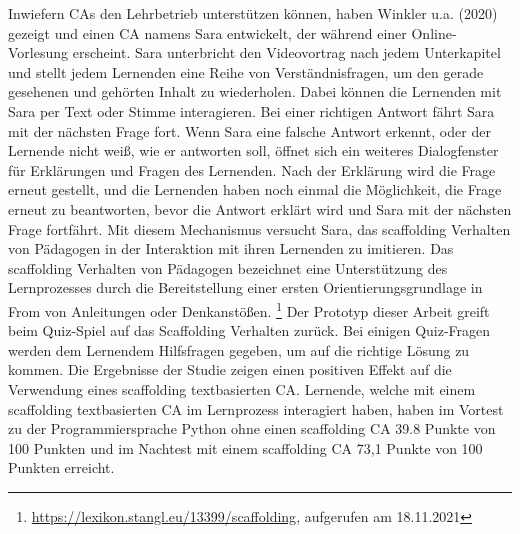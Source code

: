         Inwiefern CAs den Lehrbetrieb unterstützen können, haben Winkler u.a. (2020) gezeigt und einen CA namens Sara entwickelt, der während einer 
        Online-Vorlesung erscheint. 
        Sara unterbricht den Videovortrag nach jedem Unterkapitel
        und stellt jedem Lernenden eine Reihe von Verständnisfragen, um den gerade gesehenen und gehörten Inhalt zu wiederholen.
        Dabei können die Lernenden mit Sara per Text oder Stimme interagieren.
        Bei einer richtigen Antwort fährt Sara mit der nächsten Frage fort. 
        Wenn Sara eine falsche Antwort erkennt, oder der Lernende nicht weiß,
        wie er antworten soll, öffnet sich ein weiteres Dialogfenster für Erklärungen und Fragen 
        des Lernenden. Nach der Erklärung wird die Frage erneut gestellt, und die Lernenden haben noch einmal die Möglichkeit, 
        die Frage erneut zu beantworten, bevor die Antwort erklärt wird und Sara mit der nächsten Frage fortfährt. \parencite[4 f.]{winkler_hobert_salovaara_söllner_leimeister_2020}
        Mit diesem Mechanismus versucht Sara, das scaffolding Verhalten von Pädagogen in der Interaktion mit ihren Lernenden zu imitieren. 
        Das scaffolding Verhalten von Pädagogen bezeichnet eine Unterstützung des Lernprozesses durch die Bereitstellung einer ersten Orientierungsgrundlage
        in From von Anleitungen oder Denkanstößen. \footnote{\url{https://lexikon.stangl.eu/13399/scaffolding}, aufgerufen am 18.11.2021}
        Der Prototyp dieser Arbeit greift beim Quiz-Spiel auf das Scaffolding Verhalten zurück. Bei einigen 
        Quiz-Fragen werden dem Lernendem  
        Hilfsfragen gegeben, um auf die richtige Lösung zu kommen.
        Die Ergebnisse der Studie zeigen einen positiven Effekt auf die Verwendung eines scaffolding textbasierten CA.
        Lernende, welche mit einem scaffolding textbasierten CA im Lernprozess interagiert haben, haben im Vortest zu der Programmiersprache Python ohne 
        einen scaffolding CA
        39.8 Punkte von 100 Punkten und im Nachtest mit einem scaffolding CA 73,1 Punkte von 100 Punkten erreicht. \parencite[8 f.]{winkler_hobert_salovaara_söllner_leimeister_2020}

